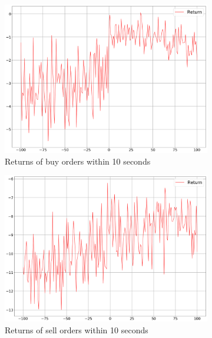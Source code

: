 \begin{figure}[H]
    \centering
    \begin{subfigure}[b]{0.45\textwidth}
        \includegraphics[width=\textwidth]{images/behaviour-up-10s-buy.png}
        \caption{Returns of buy orders within 10 seconds}
        \label{fig:behvaiour-up-10s-buy}
    \end{subfigure}
    \begin{subfigure}[b]{0.45\textwidth}
        \includegraphics[width=\textwidth]{images/behaviour-up-10s-sell.png}
        \caption{Returns of sell orders within 10 seconds}
        \label{fig:behvaiour-up-10s-sell}
    \end{subfigure}
    \begin{subfigure}[b]{0.45\textwidth}

\end{subfigure}
\end{figure}
